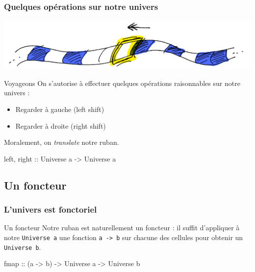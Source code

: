 \documentclass{beamer}
\begin{document}
\begin{frame}
\frametitle{Quelques opérations sur notre univers}

\begin{center}
\includegraphics[scale=0.25]{ribbon_left.png}
\end{center}
\begin{block}{Voyageons}
On s'autorise à effectuer quelques opérations raisonnables sur notre univers :
\begin{itemize}
\item Regarder à gauche (left shift)
\item Regarder à droite (right shift)
\end{itemize}
\end{block}
\pause
\begin{block}{}
Moralement, on \emph{translate} notre ruban.
\end{block}
\pause
\begin{block}{}
left, right :: Universe a -> Universe a
\end{block}
\end{frame}

\subsection{Un foncteur}
\begin{frame}
\frametitle{L'univers est fonctoriel}
\begin{block}{Un foncteur}
Notre ruban est naturellement un foncteur : il suffit d'appliquer à notre \verb!Universe a! une fonction \verb!a -> b! sur chacune des cellules pour obtenir un \verb!Universe b!.
\end{block}
\begin{block}{}
fmap :: (a -> b) -> Universe a -> Universe b
\end{block}
\end{frame}
\end{document}
